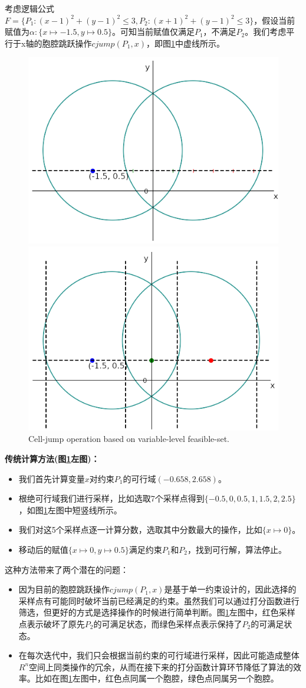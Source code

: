 \begin{example}
\label{ex:jump}
考虑逻辑公式$F = \{P_1: (x-1)^2 + (y-1)^2 \leq 3, P_2: (x+1)^2 + (y-1)^2 \leq 3\}$，假设当前赋值为$\alpha: \{x \mapsto -1.5, y \mapsto 0.5\}$。可知当前赋值仅满足$P_1$，不满足$P_2$。我们考虑平行于x轴的胞腔跳跃操作$cjump(P_1, x)$，即图\ref{fig:jump2}中虚线所示。

\begin{figure}[t]
    \centering
    \includegraphics[width=0.45\columnwidth]{Img/op1.png}\qquad
    \includegraphics[width=0.45\columnwidth]{Img/op2.png}
     {Cell-jump operation based on variable-level feasible-set.}
\label{fig:jump2}
\end{figure}

\textbf{传统计算方法(图\ref{fig:jump2}左图)：}
\begin{itemize}
    \item 我们首先计算变量$x$对约束$P_1$的可行域$(-0.658, 2.658)$。
    \item 根绝可行域我们进行采样，比如选取7个采样点得到$\{-0.5, 0, 0.5, 1, 1.5, 2, 2.5\}$，如图\ref{fig:jump2}左图中短竖线所示。
    \item 我们对这5个采样点逐一计算分数，选取其中分数最大的操作，比如$\{x \mapsto 0\}$。
    \item 移动后的赋值$\{x \mapsto 0, y \mapsto 0.5\}$满足约束$P_1$和$P_2$，找到可行解，算法停止。
\end{itemize}

这种方法带来了两个潜在的问题：
\begin{itemize}
    \item 因为目前的胞腔跳跃操作$cjump(P_1, x)$是基于单一约束设计的，因此选择的采样点有可能同时破坏当前已经满足的约束。虽然我们可以通过打分函数进行筛选，但更好的方式是选择操作的时候进行简单判断。图\ref{fig:jump2}左图中，红色采样点表示破坏了原先$P_2$的可满足状态，而绿色采样点表示保持了$P_2$的可满足状态。
    \item 在每次迭代中，我们只会根据当前约束的可行域进行采样，因此可能造成整体$R^n$空间上同类操作的冗余，从而在接下来的打分函数计算环节降低了算法的效率。比如在图\ref{fig:jump2}左图中，红色点同属一个胞腔，绿色点同属另一个胞腔。
\end{itemize}


\end{example}
